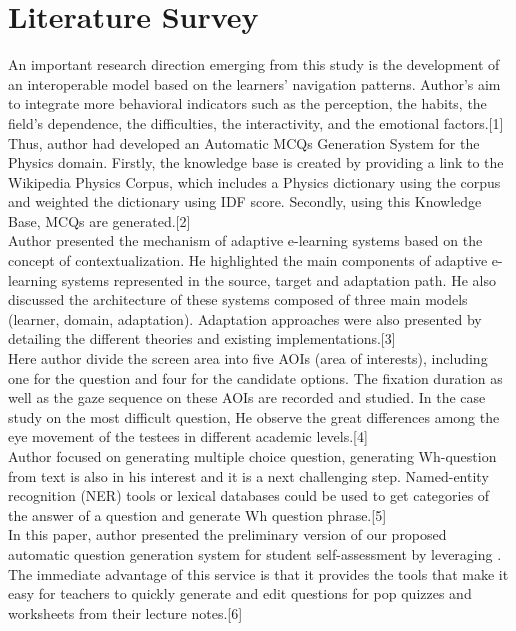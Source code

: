 \section{Literature Survey}
An important research direction emerging from this study is the development of an interoperable model based on the learners’ navigation patterns. Author’s aim to integrate more behavioral indicators such as the perception, the habits, the field’s dependence, the difficulties, the interactivity, and the emotional factors.[1]\\[0.5cm]
Thus, author had developed an Automatic MCQs Generation System for the Physics domain. Firstly, the knowledge base is created by providing a link to the Wikipedia Physics Corpus, which includes a Physics dictionary using the corpus and weighted the dictionary using IDF score. Secondly, using this Knowledge Base, MCQs are generated.[2]\\[0.5cm]
Author presented the mechanism of adaptive e-learning systems based on the concept of contextualization. He highlighted the main components of adaptive e-learning systems represented in the source, target and adaptation path. He also discussed the architecture of these systems composed of three main models (learner, domain, adaptation). Adaptation approaches were also presented by detailing the different theories and existing implementations.[3]\\[0.5cm]
Here author divide the screen area into five AOIs (area of interests), including one for the question and four for the candidate options. The fixation duration as well as the gaze sequence on these AOIs are recorded and studied. In the case study on the most difficult question, He observe the great differences among the eye movement of the testees in different academic levels.[4]\\[0.5cm]
Author focused on generating multiple choice question, generating Wh-question from text is also in his interest and it is a next challenging step. Named-entity recognition (NER) tools or lexical databases could be used to get categories of the answer of a question and generate Wh question phrase.[5]\\[0.5cm]
In this paper, author presented the preliminary version of our proposed automatic question generation system for student self-assessment by leveraging . The immediate advantage of this service is that it provides the tools that make it easy for teachers to quickly generate and edit questions for pop quizzes and worksheets from their lecture notes.[6]\\[0.5cm]
